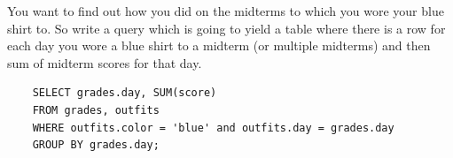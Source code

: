 \begin{blocksection}
You want to find out how you did on the midterms to which you wore your blue shirt to. So write a query which is going to yield a table where there is a row for each day you wore a blue shirt to a midterm (or multiple midterms) and then sum of midterm scores for that day. 

\begin{solution}[0.7in]
\begin{lstlisting}
    SELECT grades.day, SUM(score) 
    FROM grades, outfits 
    WHERE outfits.color = 'blue' and outfits.day = grades.day 
    GROUP BY grades.day;
\end{lstlisting}
\end{solution}
\end{blocksection}
